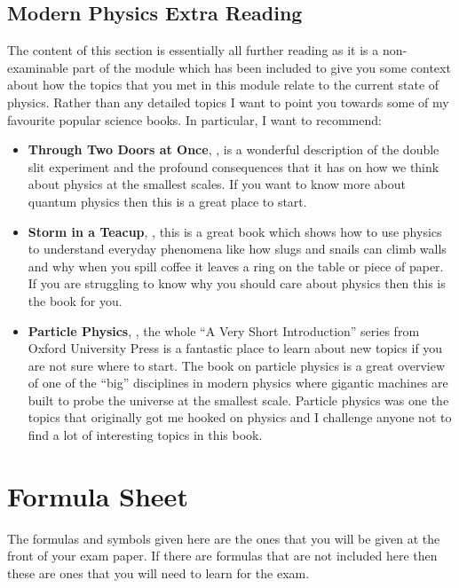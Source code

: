 \documentclass[a4paper,12pt]{book}
\begin{document}
\section{Modern Physics Extra Reading}
The content of this section is essentially all further reading as it is a non-examinable part of the module which has been included to give you some context about how the topics that you met in this module relate to the current state of physics. Rather than any detailed topics I want to point you towards some of my favourite popular science books. In particular, I want to recommend:

\begin{itemize}
\setlength{\itemsep}{-5pt}
    \item \textbf{Through Two Doors at Once}, \citep{ananthaswamy2020through}, is a wonderful description of the double slit experiment and the profound consequences that it has on how we think about physics at the smallest scales. If you want to know more about quantum physics then this is a great place to start.
    
\item \textbf{Storm in a Teacup}, \citep{czerski2016storm}, this is a great book which shows how to use physics to understand everyday phenomena like how slugs and snails can climb walls and why when you spill coffee it leaves a ring on the table or piece of paper. If you are struggling to know why you should care about physics then this is the book for you. 

\item \textbf{Particle Physics},  \citep{close2023particle}, the whole ``A Very Short Introduction'' series from Oxford University Press is a fantastic place to learn about new topics if you are not sure where to start. The book on particle physics is a great overview of one of the ``big'' disciplines in modern physics where gigantic machines are built to probe the universe at the smallest scale. Particle physics was one the topics that originally got me hooked on physics and I challenge anyone not to find a lot of interesting topics in this book.
\end{itemize}  


\chapter{Formula Sheet}
The formulas and symbols given here are the ones that you will be given at the front of your exam paper. If there are formulas that are not included here then these are ones that you will need to learn for the exam.\\
\end{document}
